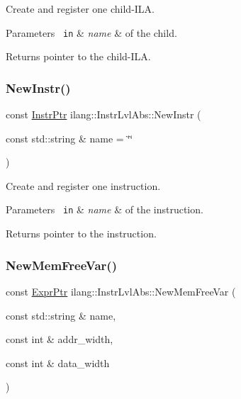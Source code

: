 Create and register one child-\/\+I\+LA. 


\begin{DoxyParams}[1]{Parameters}
\mbox{\texttt{ in}}  & {\em name} & of the child. \\
\hline
\end{DoxyParams}
\begin{DoxyReturn}{Returns}
pointer to the child-\/\+I\+LA. 
\end{DoxyReturn}
\mbox{\label{classilang_1_1_instr_lvl_abs_ac080f6d1dfa33cf5cb06d51a38b7bf3c}} 
\subsubsection{\texorpdfstring{New\+Instr()}{NewInstr()}}
{\footnotesize\ttfamily const \mbox{\hyperlink{namespaceilang_af88a19312ae653d687a0d1207bb284f6}{Instr\+Ptr}} ilang\+::\+Instr\+Lvl\+Abs\+::\+New\+Instr (\begin{DoxyParamCaption}\item[{const std\+::string \&}]{name = {\ttfamily \char`\"{}\char`\"{}} }\end{DoxyParamCaption})}



Create and register one instruction. 


\begin{DoxyParams}[1]{Parameters}
\mbox{\texttt{ in}}  & {\em name} & of the instruction. \\
\hline
\end{DoxyParams}
\begin{DoxyReturn}{Returns}
pointer to the instruction. 
\end{DoxyReturn}
\mbox{\label{classilang_1_1_instr_lvl_abs_a7f87a7520508c0a77c1b7a5012d70e95}} 
\subsubsection{\texorpdfstring{New\+Mem\+Free\+Var()}{NewMemFreeVar()}}
{\footnotesize\ttfamily const \mbox{\hyperlink{namespaceilang_a7c4196c72e53ea4df4b7861af7bc3bce}{Expr\+Ptr}} ilang\+::\+Instr\+Lvl\+Abs\+::\+New\+Mem\+Free\+Var (\begin{DoxyParamCaption}\item[{const std\+::string \&}]{name,  }\item[{const int \&}]{addr\+\_\+width,  }\item[{const int \&}]{data\+\_\+width }\end{DoxyParamCaption})}



